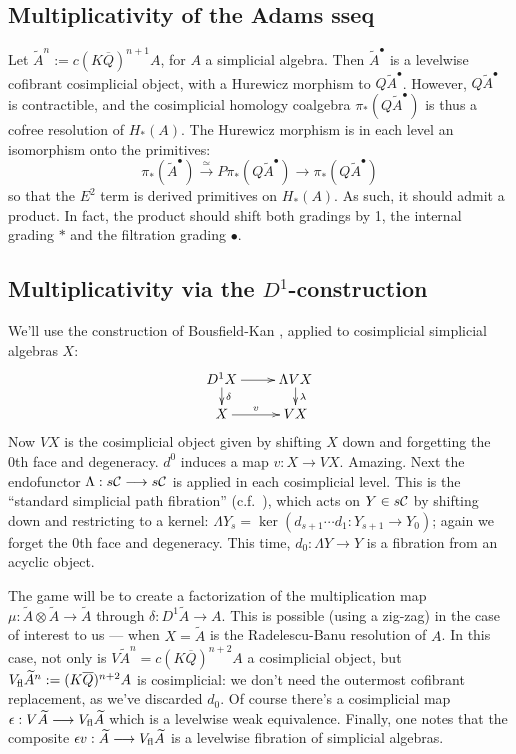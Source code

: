 \documentclass[10pt]{article}
\newcommand{\Comm}{\calC}
\begin{document}
\begin{prereqs for Thoughts III}
\pagebreak
\section{Multiplicativity of the Adams sseq}
Let $\widetilde{A}^n:=c(K\overline{Q})^{n+1}A$, for $A$ a simplicial algebra. Then $\widetilde{A}^\bullet$ is a levelwise cofibrant cosimplicial object, with a Hurewicz morphism to $Q\widetilde{A}^\bullet$. However, $Q\widetilde{A}^\bullet$ is contractible, and the cosimplicial homology coalgebra $\pi_*(Q\widetilde{A}^\bullet)$ is thus a cofree resolution of $H_*(A)$. The Hurewicz morphism is in each level an isomorphism onto the primitives:
\[\pi_*(\widetilde{A}^\bullet)\overset{\simeq}{\to}P\pi_*(Q\widetilde{A}^\bullet)\overset{}{\to}\pi_*(Q\widetilde{A}^\bullet)\]
so that the $E^2$ term is derived primitives on $H_*(A)$. As such, it should admit a product. In fact, the product should shift both gradings by 1, the internal grading $*$ and the filtration grading $\bullet$.

\subsection{Multiplicativity via the $D^1$-construction}
We'll use the construction of Bousfield-Kan \cite{BK_pairings_products.pdf,BK_pairings.pdf}, applied to cosimplicial simplicial algebras $X$:
\[\xymatrix@R=4mm{
D^1X\ar[r]
\ar[d]^-{\delta}
&%
\Lambda VX\ar[d]^-{\lambda}
\\%
X\ar[r]^-{v}
&%
VX%
}\]
Now $VX$ is the cosimplicial object given by shifting $X$ down and forgetting the 0th face and degeneracy. $d^0$ induces a map $v:X\to VX$. Amazing. Next the endofunctor $\Lambda:s\Comm\to s\Comm$ is applied in each cosimplicial level. This is the ``standard simplicial path fibration'' (c.f.\ \cite[p.82]{BousKanSSeq.pdf}), which acts on $Y\in s\Comm$ by shifting down and restricting to a kernel: $\Lambda Y_s=\ker(d_{s+1}\cdots d_1:Y_{s+1}\to Y_0)$; again we forget the 0th face and degeneracy. This time, $d_0:\Lambda Y\to Y$ is a fibration from an acyclic object.

The game will be to create a factorization of the multiplication map $\mu:\widetilde{A}\otimes \widetilde{A}\to\widetilde{A}$ through $\delta:D^1\widetilde{A}\to A$. This is possible (using a zig-zag) in the case of interest to us --- when $X=\widetilde{A}$ is the Radelescu-Banu resolution of $A$. In this case, not only is $V\widetilde{A}^n=c(K\overline{Q})^{n+2}A$ a cosimplicial object, but $V_\textup{fl}\widetilde{A}^n:=(K\overline{Q})^{n+2}A$ is cosimplicial: we don't need the outermost cofibrant replacement, as we've discarded $d_0$. Of course there's a cosimplicial map $\epsilon:V\widetilde{A}\to V_\textup{fl}\widetilde{A}$ which is a levelwise weak equivalence. Finally, one notes that the composite $\epsilon\circ v:\widetilde{A}\to V_\textup{fl}\widetilde{A}$ is a levelwise fibration of simplicial algebras. 


\end{prereqs for Thoughts III}
\end{document}
